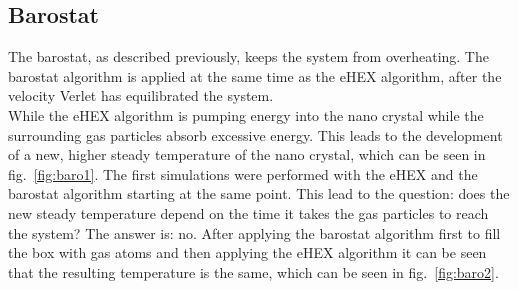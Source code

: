 \documentclass[12pt]{article}
\begin{document}
\subsection{Barostat}
The barostat, as described previously, keeps the system from overheating. The barostat algorithm is applied at the same time as the eHEX algorithm,
after the velocity Verlet has equilibrated the system.\\
While the eHEX algorithm is pumping energy into the nano crystal while the surrounding gas particles absorb excessive energy. This leads to the
development of a new, higher steady temperature of the nano crystal, which can be seen in fig.~\ref{fig:baro1}. The first simulations were performed
with the eHEX and the barostat algorithm starting at the same point. This lead to the question: does the new steady temperature depend on the time it
takes the gas particles to reach the system? The answer is: no. After applying the barostat algorithm first to fill the box with gas atoms and then
applying the eHEX algorithm it can be seen that the resulting temperature is the same, which can be seen in fig.~\ref{fig:baro2}.
\end{document}
